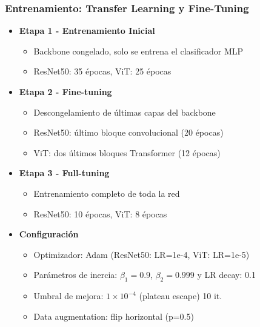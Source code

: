 \begin{frame}
\frametitle{Entrenamiento: Transfer Learning y Fine-Tuning}
\begin{itemize}
    \item \textbf{Etapa 1 - Entrenamiento Inicial}
    \begin{itemize}
        \item Backbone congelado, solo se entrena el clasificador MLP
        \item ResNet50: 35 épocas, ViT: 25 épocas
    \end{itemize}
    \item \textbf{Etapa 2 - Fine-tuning}
    \begin{itemize}
        \item Descongelamiento de últimas capas del backbone
        \item ResNet50: último bloque convolucional (20 épocas)
        \item ViT: dos últimos bloques Transformer (12 épocas)
    \end{itemize}
    \item \textbf{Etapa 3 - Full-tuning}
    \begin{itemize}
        \item Entrenamiento completo de toda la red
        \item ResNet50: 10 épocas, ViT: 8 épocas
    \end{itemize}
    \item \textbf{Configuración}
    \begin{itemize}
        \item Optimizador: Adam (ResNet50: LR=1e-4, ViT: LR=1e-5)
        \item Parámetros de inercia: $\beta_1=0.9$, $\beta_2=0.999$ y LR decay: 0.1
        \item Umbral de mejora: $1\times 10^{-4}$ (plateau escape) 10 it.
        \item Data augmentation: flip horizontal (p=0.5)
    \end{itemize}
\end{itemize}
\end{frame}

